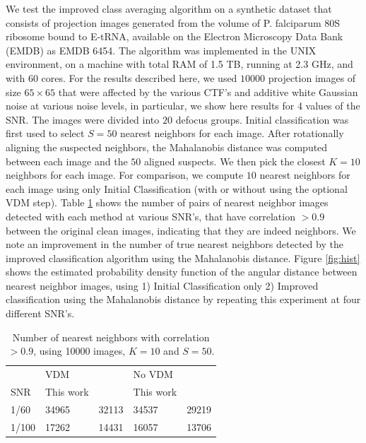 \documentclass{article}
\begin{document}
We test the improved class averaging algorithm on a synthetic dataset that consists of projection images generated from the volume of P. falciparum 80S ribosome bound to E-tRNA, available on the Electron Microscopy Data Bank (EMDB) as EMDB 6454. The algorithm was implemented in the UNIX environment, on a machine with total RAM of 1.5 TB, running at 2.3 GHz, and with 60 cores. 
For the results described here, we used $10000$ projection images of size $65 \times 65$ that were affected by the various CTF's and additive white Gaussian noise at various noise levels, in particular, we show here results for 4 values of the SNR. The images were divided into $20$ defocus groups. Initial classification was first used to select $S=50$ nearest neighbors for each image. After rotationally aligning the suspected neighbors, the Mahalanobis distance was computed between each image and the $50$ aligned suspects. We then pick the closest $K=10$ neighbors for each image. For comparison, we compute $10$ nearest neighbors for each image using only Initial Classification (with or without using the optional VDM step). Table \ref{table:1} shows the number of pairs of nearest neighbor images detected with each method at various SNR's, that have correlation $>0.9$ between the original clean images, indicating that they are indeed neighbors. We note an improvement in the number of true nearest neighbors detected by the improved classification algorithm using the Mahalanobis distance. Figure \ref{fig:hist} shows the estimated probability density function of the angular distance between nearest neighbor images, using 1) Initial Classification only 2) Improved classification using the Mahalanobis distance by repeating this experiment at four different SNR's. 

\begin{table}[]
\centering
\caption{Number of nearest neighbors with correlation $>0.9$, 
using 10000 images, $K=10$ and $S=50$.
}
\label{table:1}
\begin{tabular}{lllll}
      & \multicolumn{2}{l}{VDM} & \multicolumn{2}{l}{No VDM} \\ \cline{2-5} 
SNR   & This work        & \cite{zhao}        & This work          & \cite{zhao}         \\ \cline{2-5} 
1/60  & 34965          & 32113          & 34537            & 29219       \\
1/100 & 17262      & 14431      & 16057        & 13706        \\ \cline{2-5} 
\end{tabular}
\end{table}
\end{document}
